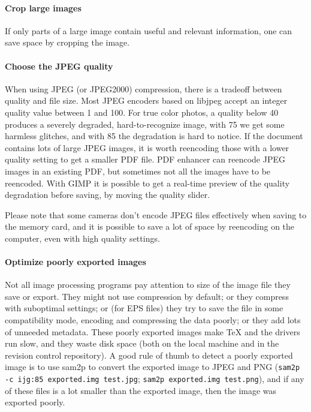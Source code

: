 \documentclass{ltugproc}
\def\cmd{\textsf}
\begin{document}
\paragraph{Crop large images}

If only parts of a large image contain useful and relevant information, one
can save space by cropping the image.

\paragraph{Choose the JPEG quality}

When using JPEG (or JPEG2000) compression, there is a tradeoff between
quality and file size. Most JPEG encoders based on libjpeg accept an integer
quality value between 1 and 100. For true color photos, a quality below 40
produces a severely degraded, hard-to-recognize image, with 75 we get some
harmless glitches, and with 85 the degradation is hard to notice. If the
document contains lots of large JPEG images, it is worth reencoding those
with a lower quality setting to get a smaller PDF file. PDF enhancer can
reencode JPEG images in an existing PDF, but sometimes not all the images
have to be reencoded. With GIMP it is possible to get a real-time preview of
the quality degradation before saving, by moving the quality slider.

Please note that some cameras don't encode JPEG files effectively when
saving to the memory card, and it is possible to save a lot of space by
reencoding on the computer, even with high quality settings.

\paragraph{Optimize poorly exported images}

Not all image processing programs pay attention to size of the image file
they save or export. They might not use compression by default; or they
compress with suboptimal settings; or (for EPS files) they try to save the
file in some compatibility mode, encoding and compressing the data poorly;
or they add lots of unneeded metadata. These poorly exported images make
\TeX{} and the drivers run slow, and they waste disk space (both on the
local machine and in the revision control repository). A good rule of thumb
to detect a poorly exported image
is to use \cmd{sam2p} to convert the exported image to JPEG and PNG
(\texttt{sam2p -c ijg:85 exported.img test.jpg};
\texttt{sam2p exported.img test.png}), and if any of these files is a lot
smaller than the exported image, then the image was exported poorly.
\end{document}

